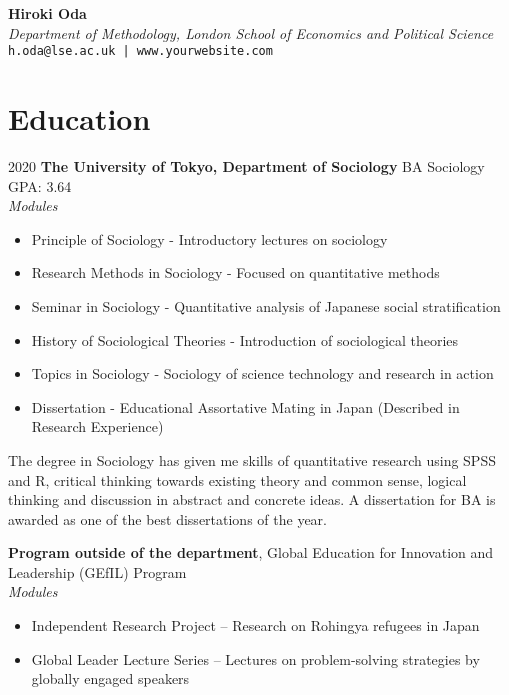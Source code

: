 \documentclass[11pt, a4paper]{article}
\begin{document}
\begin{center}
{\Large \textbf{Hiroki Oda}} \\
\textit{Department of Methodology, London School of Economics and Political Science} \\
\texttt{h.oda@lse.ac.uk | www.yourwebsite.com} \\
\end{center}

\section*{Education}
2020 \textbf{The University of Tokyo, Department of Sociology} BA Sociology \\
GPA: 3.64 \\
\textit{Modules} \\
\begin{itemize}[leftmargin=*]
    \item Principle of Sociology - Introductory lectures on sociology \\
    \item Research Methods in Sociology - Focused on quantitative methods \\
    \item Seminar in Sociology - Quantitative analysis of Japanese social stratification \\
    \item History of Sociological Theories - Introduction of sociological theories \\
    \item Topics in Sociology - Sociology of science technology and research in action \\
    \item Dissertation - Educational Assortative Mating in Japan (Described in Research Experience) \\
\end{itemize}

The degree in Sociology has given me skills of quantitative research using SPSS and R, critical thinking towards existing theory and common sense, logical thinking and discussion in abstract and concrete ideas. A dissertation for BA is awarded as one of the best dissertations of the year.

\textbf{Program outside of the department}, Global Education for Innovation and Leadership (GEfIL) Program \\
\textit{Modules} \\
\begin{itemize}[leftmargin=*]
    \item Independent Research Project – Research on Rohingya refugees in Japan \\
    \item Global Leader Lecture Series – Lectures on problem-solving strategies by globally engaged speakers \\
\end{itemize}
\end{document}
